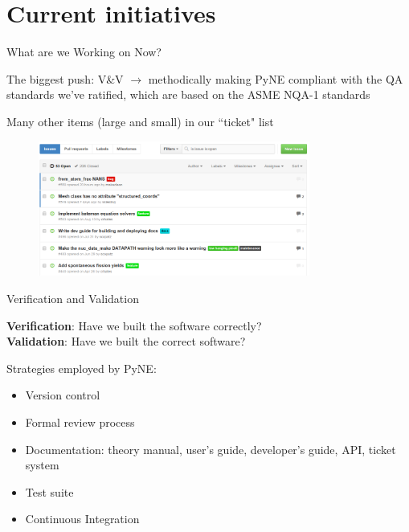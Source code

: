 \documentclass[xcolor=x11names,compress]{beamer}
\renewcommand{\(}{\begin{columns}}
\renewcommand{\)}{\end{columns}}
\newcommand{\<}[1]{\begin{column}{#1}}
\renewcommand{\>}{\end{column}}
\begin{document}
\section{Current initiatives}
\begin{frame}{What are we Working on Now?}

    The biggest push: \textcolor{dgreen}{V\&V} $\rightarrow$ methodically making PyNE compliant 
    with the QA standards we've ratified, which are based on the ASME NQA-1 standards
    \cite{pyne_vnv}

    \vspace*{1 em}
    Many other items (large and small) in our ``ticket" list
    
    \begin{center}
 	\begin{figure}
 	\includegraphics[height=1.75in,clip]{PyNE-tickets}
    \end{figure}
 	\end{center}
    
\end{frame}

\begin{frame}{Verification and Validation}

    \textbf{Verification}: Have we built the software correctly?\\
    \textbf{Validation}: Have we built the correct software?
    
    \vspace*{1 em}
    Strategies employed by PyNE:
   
    \begin{itemize}
    \item Version control
    \item Formal review process
    \item Documentation: theory manual, user's guide, developer's guide, API, 
    ticket system
    \item Test suite
    \item Continuous Integration
    \end{itemize}

\end{frame}
\end{document}
